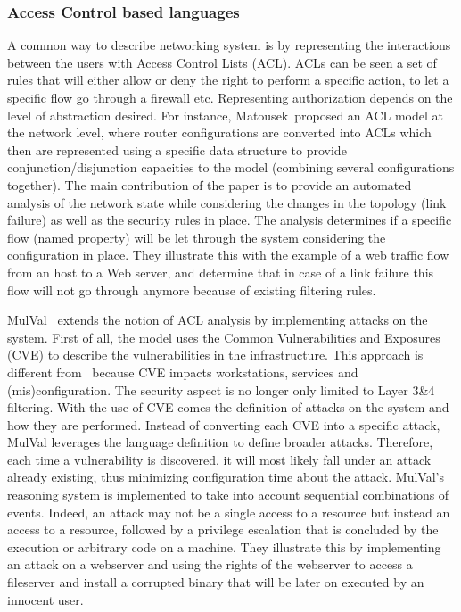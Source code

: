 \subsubsection{Access Control based languages}
A common way to describe networking system is by representing the interactions between the users with Access Control Lists (ACL).
ACLs can be seen a set of rules that will either allow or deny the right to perform a specific action, to let a specific flow go through a firewall etc.
Representing authorization depends on the level of abstraction desired.
For instance, Matousek~\etal proposed an ACL model at the network level, where router configurations are converted into ACLs which then are represented using a specific data structure to provide conjunction/disjunction capacities to the model (\ie combining several configurations together).
The main contribution of the paper is to provide an automated analysis of the network state while considering the changes in the topology (\ie link failure) as well as the security rules in place.
The analysis determines if a specific flow (named property) will be let through the system considering the configuration in place. They illustrate this with the example of a web traffic flow from an host to a Web server, and determine that in case of a link failure this flow will not go through anymore because of existing filtering rules.

MulVal~\cite{mulval-Ou2013} extends the notion of ACL analysis by implementing attacks on the system. 
First of all, the model uses the Common Vulnerabilities and Exposures (CVE) to describe the vulnerabilities in the infrastructure. This approach is different from~\cite{Matousek2008} because CVE impacts workstations, services and (mis)configuration. The security aspect is no longer only limited to  Layer 3\&4 filtering.
With the use of CVE comes the definition of attacks on the system and how they are performed.
Instead of converting each CVE into a specific attack, MulVal leverages the language definition to define broader attacks.
Therefore, each time a vulnerability is discovered, it will most likely fall under an attack already existing, thus minimizing configuration time about the attack.
MulVal's reasoning system is implemented to take into account sequential combinations of events.
Indeed, an attack may not be a single access to a resource but instead an access to a resource, followed by a privilege escalation that is concluded by the execution or arbitrary code on a machine.
They illustrate this by implementing an attack on a webserver and using the rights of the webserver to access a fileserver and install a corrupted binary that will be later on executed by an innocent user.

